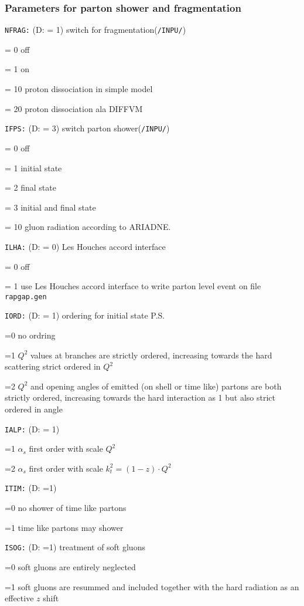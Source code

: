 \documentclass[10pt]{article} \usepackage{dina4}
\newcommand{\deflab}[1]{#1\hfil}%
\newenvironment{defl}[1]%
  {\begin{list}{}{\settowidth{\labelwidth}{#1}%
  \setlength{\leftmargin}{\labelwidth}%
  \addtolength{\leftmargin}{\labelsep}%
  \setlength{\itemsep}{0pt plus 1pt}
  \setlength{\parsep}{0pt plus 1pt}
  \setlength{\topsep}{0pt plus 1pt}
  \setlength{\partopsep}{0pt plus 1pt}
  \setlength{\parskip}{2mm plus 1mm minus 1mm}
  \let\makelabel\deflab}}%
  {\end{list}}
\begin{document}
\subsubsection{Parameters for parton shower and fragmentation}
\begin{defl}{123456789012345}
\item[{\tt NFRAG:}] (D: = 1)
                        switch for fragmentation(\verb+/INPU/+)
\item[] = 0 off
\item[] = 1 on 
\item[] = 10 proton dissociation in simple model
\item[] = 20 proton dissociation ala DIFFVM
\item[{\tt IFPS:}] (D: = 3)
                  switch  parton shower(\verb+/INPU/+)
\item[] = 0 off
\item[] = 1 initial state
\item[] = 2 final state
\item[] = 3 initial and final state  
\item[] = 10 gluon radiation according to ARIADNE.

\item[{\tt ILHA:}] (D: = 0) Les Houches accord interface     
\item[] = 0 off
\item[] = 1  use Les Houches accord interface to write parton level event on
file \verb+rapgap.gen+


\item[{\tt IORD:}] (D: = 1) ordering for initial state P.S.
\item[] =0 no ordring
\item[] =1 $Q^2$ values at branches are strictly
             ordered, increasing towards the hard
             scattering strict ordered in $Q^2$
\item[]=2 $Q^2$ and opening angles of emitted
          (on shell or time like) partons
           are both strictly ordered, increasing
          towards the hard interaction as 1
          but also strict ordered in angle
\item[{\tt IALP:}] (D: = 1)  
\item[] =1 $\alpha_s$ first order with scale $Q^2$
\item[]=2 $\alpha_s$ first order with scale
           $k_t^2=(1-z) \cdot Q^2$
\item[{\tt ITIM:}] (D: =1)
\item[] =0 no shower of time like partons
\item[] =1 time like partons may shower
\item[{\tt ISOG:}] (D: =1) treatment of soft gluons
\item[] =0 soft gluons are entirely neglected
\item[] =1 soft gluons are resummed and included
           together with the hard radiation
           as an effective $z$ shift
 

\end{defl}
\end{document}
